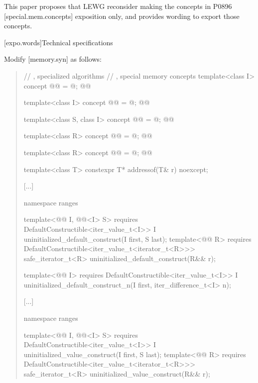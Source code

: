 This paper proposes that LEWG reconsider making the concepts in P0896
[special.mem.concepts] exposition only, and provides wording to export those
concepts.

[expo.words]{Technical specifications}

Modify [memory.syn] as follows:
\begin{quote}
\begin{codeblock}
  // , specialized algorithms
  // , special memory concepts
  template<class I>
    concept @@ = @\seebelownc@; @\removed{// \expos}@

  template<class I>
    concept @@ = @\seebelownc@; @\removed{// \expos}@

  template<class S, class I>
    concept @@ = @\seebelownc@; @\removed{// \expos}@

  template<class R>
    concept @@ = @\seebelownc@; @\removed{// \expos}@

  template<class R>
    concept @@ = @\seebelownc@; @\removed{// \expos}@

  template<class T>
    constexpr T* addressof(T& r) noexcept;

  [...]

  namespace ranges {
    template<@@ I,
             @@<I> S>
      requires DefaultConstructible<iter_value_t<I>>
        I uninitialized_default_construct(I first, S last);
    template<@@ R>
      requires DefaultConstructible<iter_value_t<iterator_t<R>>>
        safe_iterator_t<R> uninitialized_default_construct(R&& r);

    template<@@ I>
      requires DefaultConstructible<iter_value_t<I>>
        I uninitialized_default_construct_n(I first, iter_difference_t<I> n);
  }

  [...]

  namespace ranges {
    template<@@ I,
             @@<I> S>
      requires DefaultConstructible<iter_value_t<I>>
        I uninitialized_value_construct(I first, S last);
    template<@@ R>
      requires DefaultConstructible<iter_value_t<iterator_t<R>>>
        safe_iterator_t<R> uninitialized_value_construct(R&& r);

}
\end{codeblock}
\end{quote}
